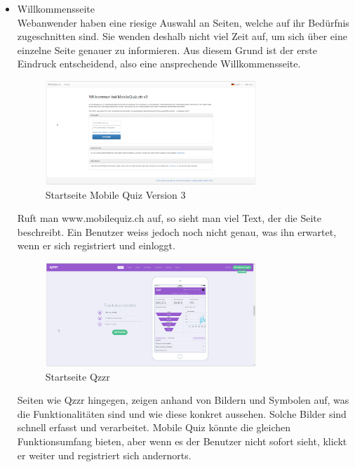 	\begin{itemize}
		\item Willkommensseite \\
		Webanwender haben eine riesige Auswahl an Seiten, welche auf ihr Bedürfnis zugeschnitten sind. Sie wenden deshalb nicht viel Zeit auf, um sich über eine einzelne Seite genauer zu informieren. Aus diesem Grund ist der erste Eindruck entscheidend, also eine ansprechende Willkommensseite. \\
		
		\begin{figure}[H]
			\centering
			\includegraphics[width=0.75\textwidth]{Images/MobileQuiz_StartPage.PNG}
			\caption{Startseite Mobile Quiz Version 3}
		\end{figure}
		
		Ruft man www.mobilequiz.ch auf, so sieht man viel Text, der die Seite beschreibt. Ein Benutzer weiss jedoch noch nicht genau, was ihn erwartet, wenn er sich registriert und einloggt.
		
		\begin{figure}[H]
			\centering
			\includegraphics[width=0.75\textwidth]
			{Images/Qzzr_StartPage_Statistics.PNG}
			\caption{Startseite Qzzr}
		\end{figure}
				
		Seiten wie Qzzr \cite{qzzr.com} hingegen, zeigen anhand von Bildern und Symbolen auf, was die Funktionalitäten sind und wie diese konkret aussehen. Solche Bilder sind schnell erfasst  und verarbeitet.
		Mobile Quiz könnte die gleichen Funktionsumfang bieten, aber wenn es der Benutzer nicht sofort sieht, klickt er weiter und registriert sich andernorts.
		

\end{itemize}
